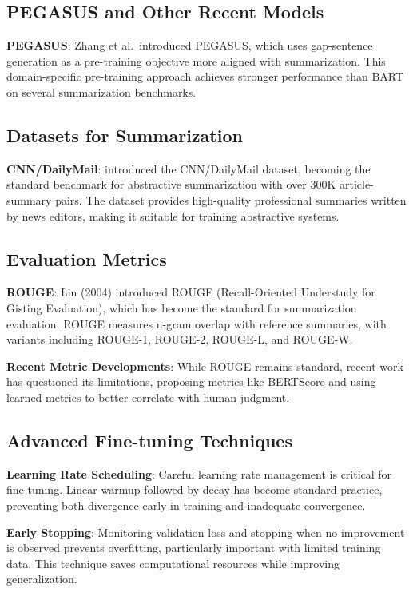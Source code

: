 \documentclass[12pt,a4paper,oneside]{report}
\begin{document}
\subsection{PEGASUS and Other Recent Models}
\textbf{PEGASUS}: Zhang et al.\ introduced PEGASUS, which uses gap-sentence generation as a pre-training objective more aligned with summarization. This domain-specific pre-training approach achieves stronger performance than BART on several summarization benchmarks.

\subsection{Datasets for Summarization}
\textbf{CNN/DailyMail}: \cite{hermann2015teaching} introduced the CNN/DailyMail dataset, becoming the standard benchmark for abstractive summarization with over 300K article-summary pairs. The dataset provides high-quality professional summaries written by news editors, making it suitable for training abstractive systems.

\subsection{Evaluation Metrics}
\textbf{ROUGE}: Lin (2004) introduced ROUGE (Recall-Oriented Understudy for Gisting Evaluation), which has become the standard for summarization evaluation. ROUGE measures n-gram overlap with reference summaries, with variants including ROUGE-1, ROUGE-2, ROUGE-L, and ROUGE-W.

\textbf{Recent Metric Developments}: While ROUGE remains standard, recent work has questioned its limitations, proposing metrics like BERTScore and using learned metrics to better correlate with human judgment.

\subsection{Advanced Fine-tuning Techniques}
\textbf{Learning Rate Scheduling}: Careful learning rate management is critical for fine-tuning. Linear warmup followed by decay has become standard practice, preventing both divergence early in training and inadequate convergence.

\textbf{Early Stopping}: Monitoring validation loss and stopping when no improvement is observed prevents overfitting, particularly important with limited training data. This technique saves computational resources while improving generalization.
\end{document}
